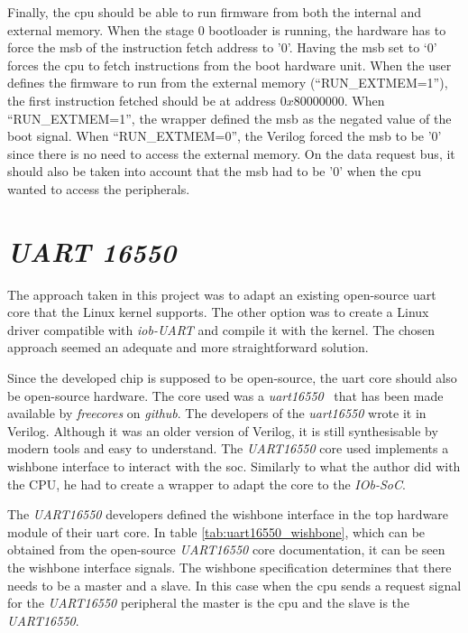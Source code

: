 Finally, the \acrshort{cpu} should be able to run firmware from both the internal and external memory. When the stage 0 bootloader is running, the hardware has to force the \acrfull{msb} of the instruction fetch address to '0'. Having the \acrshort{msb} set to ‘0’ forces the \acrshort{cpu} to fetch instructions from the boot hardware unit. When the user defines the firmware to run from the external memory (\enquote{RUN\_EXTMEM=1}), the first instruction fetched should be at address $0x80000000$. When \enquote{RUN\_EXTMEM=1}, the wrapper defined the \acrfull{msb} as the negated value of the boot signal. When \enquote{RUN\_EXTMEM=0}, the Verilog forced the \acrshort{msb} to be '0' since there is no need to access the external memory. On the data request bus, it should also be taken into account that the \acrshort{msb} had to be '0' when the \acrshort{cpu} wanted to access the peripherals.

\section{\textit{UART 16550}}
\label{section:uart}
The approach taken in this project was to adapt an existing open-source \acrfull{uart} core that the Linux kernel supports. The other option was to create a Linux driver compatible with \textit{iob-UART} and compile it with the kernel. The chosen approach seemed an adequate and more straightforward solution.

Since the developed chip is supposed to be open-source, the \acrshort{uart} core should also be open-source hardware. The core used was a \textit{\acrshort{uart}16550}~\cite{gorban2002uart} that has been made available by \textit{freecores} on \textit{github}. The developers of the \textit{\acrshort{uart}16550} wrote it in Verilog. Although it was an older version of Verilog, it is still synthesisable by modern tools and easy to understand. The \textit{UART16550} core used implements a wishbone interface to interact with the \acrfull{soc}. Similarly to what the author did with the CPU, he had to create a wrapper to adapt the core to the \textit{IOb-SoC}.

The \textit{UART16550} developers defined the wishbone interface in the top hardware module of their \acrshort{uart} core. In table \ref{tab:uart16550_wishbone}, which can be obtained from the open-source \textit{UART16550} core documentation, it can be seen the wishbone interface signals. The wishbone specification determines that there needs to be a master and a slave. In this case when the \acrshort{cpu} sends a request signal for the \textit{UART16550} peripheral the master is the \acrshort{cpu} and the slave is the \textit{UART16550}.


